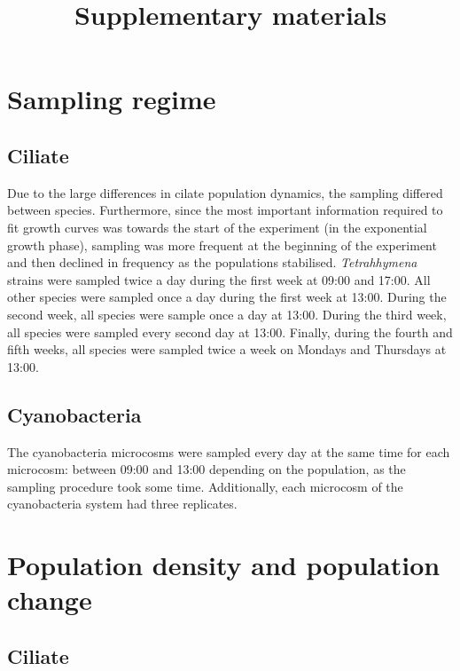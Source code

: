 \title{\Huge Supplementary materials}

\maketitle

\setcounter{section}{0}
\setcounter{figure}{0}
\renewcommand{\figurename}{Fig.}
\renewcommand{\thefigure}{S\arabic{figure}}

\section{Sampling regime} \label{sec:sampling_times}

\subsection{Ciliate}

Due to the large differences in cilate population dynamics, the sampling differed between species. Furthermore, since the most important information required to fit growth curves was towards the start of the experiment (in the exponential growth phase), sampling was more frequent at the beginning of the experiment and then declined in frequency as the populations stabilised. \textit{Tetrahhymena} strains were sampled twice a day during the first week at 09:00 and 17:00. All other species were sampled once a day during the first week at 13:00. During the second week, all species were sample once a day at 13:00. During the third week, all species were sampled every second day at 13:00. Finally, during the fourth and fifth weeks, all species were sampled twice a week on Mondays and Thursdays at 13:00.

\subsection{Cyanobacteria}

The cyanobacteria microcosms were sampled every day at the same time for each microcosm: between 09:00 and 13:00 depending on the population, as the sampling procedure took some time. Additionally, each microcosm of the cyanobacteria system had three replicates.

\section{Population density and population change}

\subsection{Ciliate}

